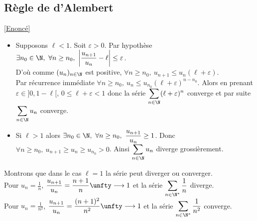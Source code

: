 \documentclass{book}
\begin{document}
	\subsection{Règle de d'Alembert }
	\label{sec:regle-de-dalembert}
	\textcolor{blue}{\hyperref[Règle de d'Alembert]{[Enoncé]}}\\
	\begin{itemize}
		\item Supposons $\ell<1$. Soit $\varepsilon>0$. Par hypothèse $\exists n_0\in \N,\ \forall n\geq n_0,\ \left|\dfrac{u_{n+1}}{u_n}-\ell\right|\leq \varepsilon$.\\
		D'où comme $(u_n)_{n\in \N}$ est positive, $\forall n\geq n_0,\ u_{n+1}\leq u_n(\ell+\varepsilon)$.\\
		Par récurrence immédiate $\forall n\geq n_0,\ u_n\leq u_{n_0}(\ell+\varepsilon)^{n-n_0}$. Alors en prenant $\varepsilon\in ]0,1-\ell[$, $0\leq\ell+\varepsilon<1$ donc la série $\displaystyle\sum_{n\in \N}(\ell+\varepsilon)^n$ converge et par suite $\displaystyle\sum_{n\in \N}u_n$ converge.
		\item Si $\ell>1$ alors $\exists n_0\in \N,\ \forall n\geq n_0,\ \dfrac{u_{n+1}}{u_n}\geq 1$. Donc $\forall n\geq n_0,\ u_{n+1}\geq u_n\geq u_{n_0}>0$. Ainsi $\displaystyle\sum_{n\in \N}u_n$ diverge grossièrement.
	\end{itemize}
	Montrons que dans le cas $\ell=1$ la série peut diverger ou converger.\\
	Pour $u_n=\displaystyle\frac{1}{n}$, $\displaystyle\frac{u_{n+1}}{u_n}=\frac{n+1}{n}\unfty\longrightarrow 1$ et la série $\displaystyle\sum_{n\in \N^*}\frac{1}{n}$ diverge.\\
	Pour $u_n=\displaystyle\frac{1}{n^2}$, $\displaystyle\frac{u_{n+1}}{u_n}=\frac{(n+1)^2}{n^2}\unfty\longrightarrow 1$ et la série $\displaystyle\sum_{n\in \N^*}\frac{1}{n^2}$ converge.
	
\end{document}
